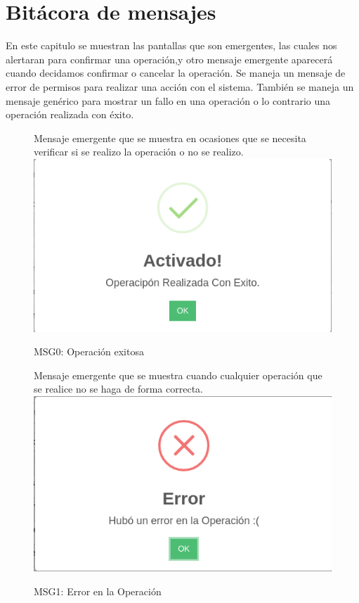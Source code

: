 \chapter{Bitácora de mensajes}
En este capitulo se muestran las pantallas que son emergentes,
las cuales nos alertaran para confirmar una operación,y otro mensaje emergente
aparecerá cuando decidamos confirmar o cancelar la operación.
Se maneja un mensaje de error de permisos para realizar una acción con el sistema.
También se maneja un  mensaje genérico para mostrar un fallo en una operación
o lo contrario una operación realizada con éxito.

\begin{figure}[htbp!]
	\begin{center}
	Mensaje emergente que se muestra en ocasiones que se necesita verificar si se realizo la operación o no se realizo.
		\includegraphics[scale=.5]{Pantallas/OperacionExitosa}
		\caption{MSG0: Operación exitosa}
	\end{center}
\end{figure}



\begin{figure}[htbp!]
	\begin{center}
	Mensaje emergente que se muestra cuando cualquier operación que se realice no se haga de forma correcta.
		\includegraphics[scale=.5]{Pantallas/ErrorOperacion}
		\caption{MSG1: Error en la Operación}
	\end{center}
\end{figure}


